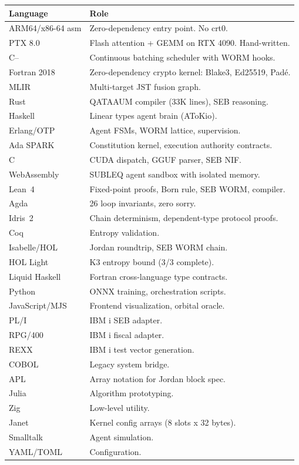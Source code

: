 \documentclass[11pt,a4paper]{article}
\begin{document}
\begin{center}
\begin{tabular}{lp{8.5cm}}
\toprule
\textbf{Language} & \textbf{Role} \\
\midrule
ARM64/x86-64 asm & Zero-dependency entry point. No crt0. \\
PTX 8.0 & Flash attention + GEMM on RTX 4090. Hand-written. \\
C-- & Continuous batching scheduler with WORM hooks. \\
Fortran 2018 & Zero-dependency crypto kernel: Blake3, Ed25519, Pad\'e. \\
MLIR & Multi-target JST fusion graph. \\
Rust & QATAAUM compiler (33K lines), SEB reasoning. \\
Haskell & Linear types agent brain (AToKio). \\
Erlang/OTP & Agent FSMs, WORM lattice, supervision. \\
Ada SPARK & Constitution kernel, execution authority contracts. \\
C & CUDA dispatch, GGUF parser, SEB NIF. \\
WebAssembly & SUBLEQ agent sandbox with isolated memory. \\
Lean~4 & Fixed-point proofs, Born rule, SEB WORM, compiler. \\
Agda & 26 loop invariants, zero sorry. \\
Idris~2 & Chain determinism, dependent-type protocol proofs. \\
Coq & Entropy validation. \\
Isabelle/HOL & Jordan roundtrip, SEB WORM chain. \\
HOL Light & K3 entropy bound (3/3 complete). \\
Liquid Haskell & Fortran cross-language type contracts. \\
Python & ONNX training, orchestration scripts. \\
JavaScript/MJS & Frontend visualization, orbital oracle. \\
PL/I & IBM i SEB adapter. \\
RPG/400 & IBM i fiscal adapter. \\
REXX & IBM i test vector generation. \\
COBOL & Legacy system bridge. \\
APL & Array notation for Jordan block spec. \\
Julia & Algorithm prototyping. \\
Zig & Low-level utility. \\
Janet & Kernel config arrays (8 slots x 32 bytes). \\
Smalltalk & Agent simulation. \\
YAML/TOML & Configuration. \\
\bottomrule
\end{tabular}
\end{center}
\end{document}
